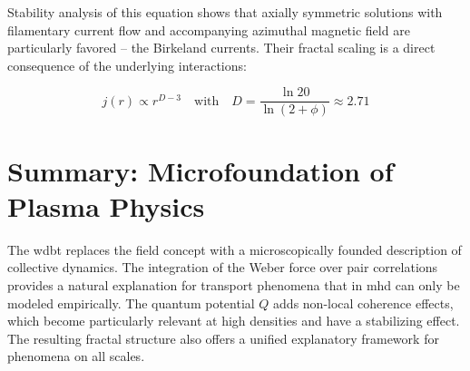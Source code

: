 Stability analysis of this equation shows that axially symmetric solutions with filamentary current flow and accompanying azimuthal magnetic field are particularly favored – the Birkeland currents. Their fractal scaling is a direct consequence of the underlying interactions:

\begin{equation}
    \label{eq:fractal_scaling}
    j(r) \propto r^{D-3} \quad \text{with} \quad D = \frac{\ln 20}{\ln(2+\phi)} \approx 2.71
\end{equation}

\section{Summary: Microfoundation of Plasma Physics}
The \gls{wdbt} replaces the field concept with a microscopically founded description of collective dynamics. The integration of the Weber force over pair correlations provides a natural explanation for transport phenomena that in \gls{mhd} can only be modeled empirically. The quantum potential $Q$ adds non-local coherence effects, which become particularly relevant at high densities and have a stabilizing effect. The resulting fractal structure also offers a unified explanatory framework for phenomena on all scales.